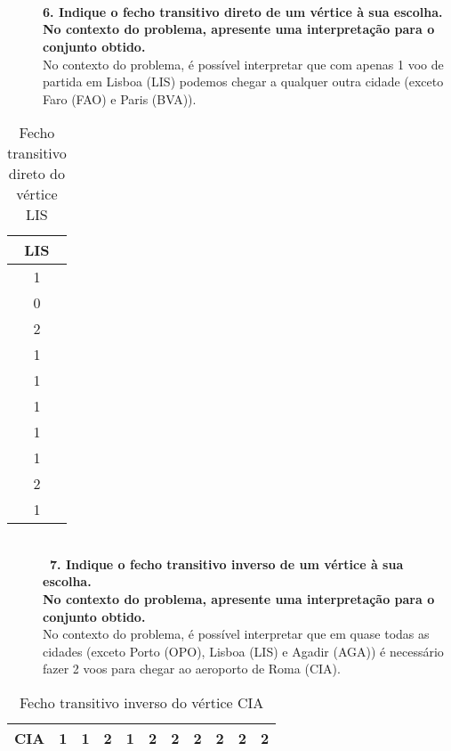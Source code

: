 \documentclass[a4wide]{report}
\begin{document}
\begin{description} 
\item[]\textbf{\\\\\\\\\\\\\\\\\\\\\\\\\\6. Indique o fecho transitivo direto de um vértice à sua escolha.\\
No contexto do problema, apresente uma interpretação para o conjunto obtido.\\
}
No contexto do problema, é possível interpretar que com apenas 1 voo de partida em Lisboa (LIS) podemos chegar a qualquer outra cidade (exceto Faro (FAO) e Paris (BVA)).
\end{description}
\begin{table}[h]
    \centering
    \begin{tabular}{|c|}
        \hline
        LIS \\
        \hline
        1 \\
        \hline
        0 \\
        \hline
        2 \\
        \hline
        1 \\
        \hline
        1 \\
        \hline
        1 \\
        \hline
        1 \\
        \hline
        1 \\
        \hline
        2 \\
        \hline
        1 \\
        \hline
    \end{tabular}
        \caption{Fecho transitivo direto do vértice LIS}
\end{table}

\begin{description} 
\item[]\textbf{\\\ 7. Indique o fecho transitivo inverso de um vértice à sua escolha.\\
No contexto do problema, apresente uma interpretação para o conjunto obtido.\\
}
No contexto do problema, é possível interpretar que em quase todas as cidades (exceto Porto (OPO), Lisboa (LIS) e Agadir (AGA)) é necessário fazer 2 voos para chegar ao aeroporto de Roma (CIA).
\end{description}
\begin{table}[h]
    \centering
    \begin{tabular}{|c|c|c|c|c|c|c|c|c|c|c|}
        \hline
        CIA & 1 & 1 & 2 & 1 & 2 & 2 & 2 & 2 & 2 & 2 \\
        \hline
    \end{tabular}
            \caption{Fecho transitivo inverso do vértice CIA}
\end{table}
\end{document}
